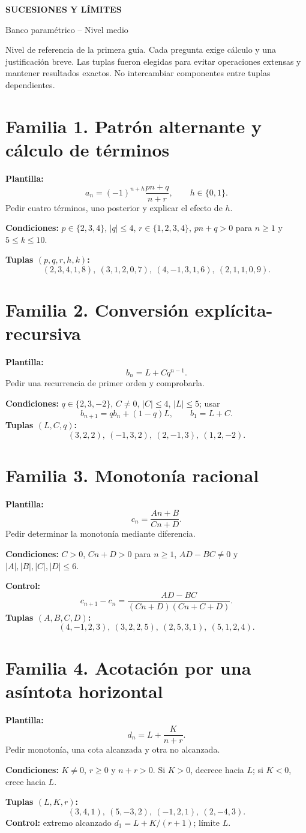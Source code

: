 \documentclass[12pt,letterpaper]{article}
\newcommand{\familia}[2]{\section*{Familia #1. #2}}
\newcommand{\campo}[1]{\textcolor{azul}{\textbf{#1}}}
\begin{document}
\begin{center}
{\LARGE\bfseries\color{azul} SUCESIONES Y LÍMITES}\par
{\Large Banco paramétrico -- Nivel medio}
\end{center}
\begin{tcolorbox}[colback=claro,colframe=azul]
Nivel de referencia de la primera guía. Cada pregunta exige cálculo y una justificación
breve. Las tuplas fueron elegidas para evitar operaciones extensas y mantener resultados
exactos. No intercambiar componentes entre tuplas dependientes.
\end{tcolorbox}

\familia{1}{Patrón alternante y cálculo de términos}
\campo{Plantilla:}
\[
 a_n=(-1)^{n+h}\frac{pn+q}{n+r},\qquad h\in\{0,1\}.
\]
Pedir cuatro términos, uno posterior y explicar el efecto de $h$.\par
\campo{Condiciones:} $p\in\{2,3,4\}$, $|q|\leq4$, $r\in\{1,2,3,4\}$,
$pn+q>0$ para $n\geq1$ y $5\leq k\leq10$.\par
\campo{Tuplas $(p,q,r,h,k)$:}
\[
 (2,3,4,1,8),\ (3,1,2,0,7),\ (4,-1,3,1,6),\ (2,1,1,0,9).
\]

\familia{2}{Conversión explícita-recursiva}
\campo{Plantilla:}
\[
 b_n=L+Cq^{n-1}.
\]
Pedir una recurrencia de primer orden y comprobarla.\par
\campo{Condiciones:} $q\in\{2,3,-2\}$, $C\neq0$, $|C|\leq4$, $|L|\leq5$;
usar
\[
 b_{n+1}=q b_n+(1-q)L,\qquad b_1=L+C.
\]
\campo{Tuplas $(L,C,q)$:}
\[
 (3,2,2),\ (-1,3,2),\ (2,-1,3),\ (1,2,-2).
\]

\familia{3}{Monotonía racional}
\campo{Plantilla:}
\[
 c_n=\frac{An+B}{Cn+D}.
\]
Pedir determinar la monotonía mediante diferencia.\par
\campo{Condiciones:} $C>0$, $Cn+D>0$ para $n\geq1$, $AD-BC\neq0$ y
$|A|,|B|,|C|,|D|\leq6$.\par
\campo{Control:}
\[
 c_{n+1}-c_n=\frac{AD-BC}{(Cn+D)(Cn+C+D)}.
\]
\campo{Tuplas $(A,B,C,D)$:}
\[
 (4,-1,2,3),\ (3,2,2,5),\ (2,5,3,1),\ (5,1,2,4).
\]

\familia{4}{Acotación por una asíntota horizontal}
\campo{Plantilla:}
\[
 d_n=L+\frac{K}{n+r}.
\]
Pedir monotonía, una cota alcanzada y otra no alcanzada.\par
\campo{Condiciones:} $K\neq0$, $r\geq0$ y $n+r>0$. Si $K>0$, decrece hacia
$L$; si $K<0$, crece hacia $L$.\par
\campo{Tuplas $(L,K,r)$:}
\[
 (3,4,1),\ (5,-3,2),\ (-1,2,1),\ (2,-4,3).
\]
\campo{Control:} extremo alcanzado $d_1=L+K/(r+1)$; límite $L$.
\end{document}

